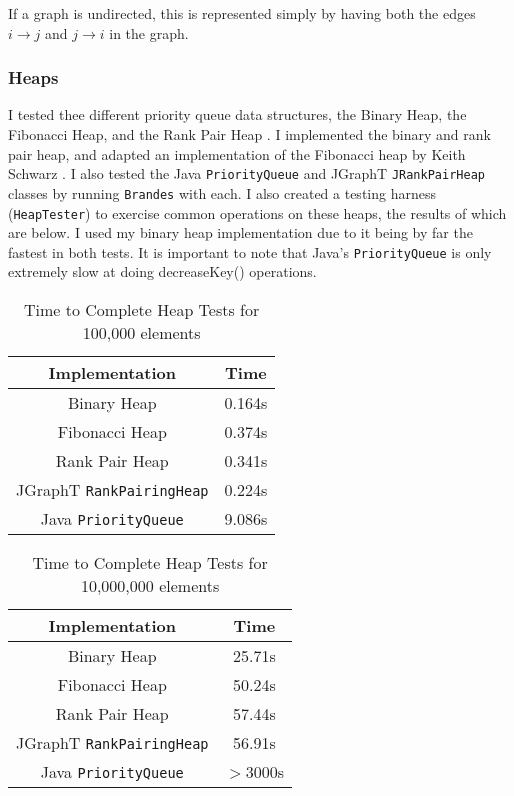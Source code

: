 \documentclass[12pt,a4paper,twoside,openright]{report}
\newcommand{\ttt}[1]{\texttt{#1}}
\begin{document}
		If a graph is undirected, this is represented simply by having both the edges $i\rightarrow j$ and $j \rightarrow i$ in the graph.
		
		\subsubsection{Heaps} \label{sec:heaps}
		I tested thee different priority queue data structures, the Binary Heap, the Fibonacci Heap, and the Rank Pair Heap \cite{fredman}. I implemented the binary and rank pair heap, and adapted an implementation of the Fibonacci heap by Keith Schwarz \cite{schwarz}. I also tested the Java \ttt{PriorityQueue} and JGraphT \ttt{JRankPairHeap} classes by running \ttt{Brandes} with each. I also created a testing harness (\ttt{HeapTester}) to exercise common operations on these heaps, the results of which are below. I used my binary heap implementation due to it being by far the fastest in both tests. It is important to note that Java's \ttt{PriorityQueue} is only extremely slow at doing decreaseKey() operations.
		
		\begin{table}[h]
			\label{tab:heaps}
			\centering
			\caption{Time to Complete Heap Tests for 100,000 elements}
			\begin{tabular}{|c|c|}
				\hline 
				\textbf{Implementation} & \textbf{Time} \\ 
				\hline 
				Binary Heap & 0.164s\\
				\hline
				Fibonacci Heap & 0.374s\\
				\hline
				Rank Pair Heap & 0.341s\\
				\hline
				JGraphT \ttt{RankPairingHeap}& 0.224s\\
				\hline
				Java \ttt{PriorityQueue} & 9.086s\\
				\hline 
			\end{tabular}
		\end{table}
		
		\begin{table}[h]
			\label{tab:heaps2}
			\centering
			\caption{Time to Complete Heap Tests for 10,000,000 elements}
			\begin{tabular}{|c|c|}
				\hline 
				\textbf{Implementation} & \textbf{Time} \\ 
				\hline 
				Binary Heap & 25.71s\\
				\hline
				Fibonacci Heap & 50.24s\\
				\hline
				Rank Pair Heap & 57.44s\\
				\hline
				JGraphT \ttt{RankPairingHeap}& 56.91s\\
				\hline
				Java \ttt{PriorityQueue} & $>3000$s\\
				\hline 
			\end{tabular}
		\end{table}
\end{document}
